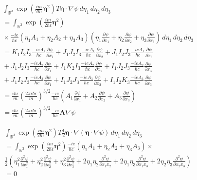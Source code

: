 \documentclass[12pt]{article}
\newcommand\INT{\int_{\mathbb R^3}}
\begin{document}
\begin{align*}
&
\INT\exp\left(\frac{im}{2\hbar\epsilon}\boldsymbol\eta^2\right)
T
\boldsymbol\eta\cdot\nabla\psi
\,d\eta_1\,d\eta_2\,d\eta_3
\\
&{}
=\INT\exp\left(\frac{im}{2\hbar\epsilon}\boldsymbol\eta^2\right)
\\
&{}\times
\frac{-ie}{\hbar c}
(\eta_1A_1+\eta_2A_2+\eta_3A_3)
\left(
 \eta_1\frac{\partial\psi}{\partial x_1}
+\eta_2\frac{\partial\psi}{\partial x_2}
+\eta_3\frac{\partial\psi}{\partial x_3}
\right)
\,d\eta_1\,d\eta_2\,d\eta_3
\\
&{}
=K_1 I_2 I_3 \frac{-ieA_1}{\hbar c} \frac{\partial\psi}{\partial x_1}
+J_1 J_2 I_3 \frac{-ieA_1}{\hbar c} \frac{\partial\psi}{\partial x_2}
+J_1 I_2 J_3 \frac{-ieA_1}{\hbar c} \frac{\partial\psi}{\partial x_3}
\\
&{}
+J_1 J_2 I_3 \frac{-ieA_2}{\hbar c} \frac{\partial\psi}{\partial x_1}
+I_1 K_2 I_3 \frac{-ieA_2}{\hbar c} \frac{\partial\psi}{\partial x_2}
+I_1 J_2 J_3 \frac{-ieA_2}{\hbar c} \frac{\partial\psi}{\partial x_3}
\\
&{}
+J_1 I_2 J_3 \frac{-ieA_3}{\hbar c} \frac{\partial\psi}{\partial x_1}
+I_1 J_2 J_3 \frac{-ieA_3}{\hbar c} \frac{\partial\psi}{\partial x_2}
+I_1 I_2 K_3 \frac{-ieA_3}{\hbar c} \frac{\partial\psi}{\partial x_3}
\\
&{}
=\frac{i\hbar\epsilon}{m}\left(\frac{2\pi i\hbar\epsilon}{m}\right)^{3/2}\frac{-ie}{\hbar c}
\left(
 A_1\frac{\partial\psi}{\partial x_1}
+A_2\frac{\partial\psi}{\partial x_2}
+A_3\frac{\partial\psi}{\partial x_3}
\right)
\\
&{}
=\frac{i\hbar\epsilon}{m}\left(\frac{2\pi i\hbar\epsilon}{m}\right)^{3/2}
\frac{-ie}{\hbar c}\mathbf A\nabla\psi
\tag{11}
\end{align*}

\begin{align*}
&
\INT
\exp\left(\frac{im}{2\hbar\epsilon}\boldsymbol\eta^2\right)
T
\tfrac{1}{2}\boldsymbol\eta\cdot\nabla(\boldsymbol\eta\cdot\nabla\psi)
\,d\eta_1\,d\eta_2\,d\eta_3
\\
&{}=\INT
\exp\left(\frac{im}{2\hbar\epsilon}\boldsymbol\eta^2\right)
\frac{-ie}{\hbar c}(\eta_1A_1+\eta_2A_2+\eta_3A_3)\times{}
\\
&{}\frac{1}{2}\left(
 \eta_1^2\frac{\partial^2\psi}{\partial x_1^2}
+\eta_2^2\frac{\partial^2\psi}{\partial x_2^2}
+\eta_3^2\frac{\partial^2\psi}{\partial x_3^2}
+2\eta_1\eta_2\frac{\partial^2\psi}{\partial x_1x_2}
+2\eta_1\eta_3\frac{\partial^2\psi}{\partial x_1x_3}
+2\eta_2\eta_3\frac{\partial^2\psi}{\partial x_2x_3}
\right)
\\
&{}
=0
\tag{12}
\end{align*}
\end{document}
